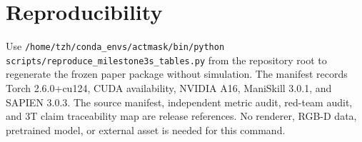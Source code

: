 \section{Reproducibility}
Use \texttt{/home/tzh/conda\_envs/actmask/bin/python scripts/reproduce\_milestone3s\_tables.py} from the repository root to regenerate the frozen paper package without simulation. The manifest records Torch 2.6.0+cu124, CUDA availability, NVIDIA A16, ManiSkill 3.0.1, and SAPIEN 3.0.3. The source manifest, independent metric audit, red-team audit, and 3T claim traceability map are release references. No renderer, RGB-D data, pretrained model, or external asset is needed for this command.
